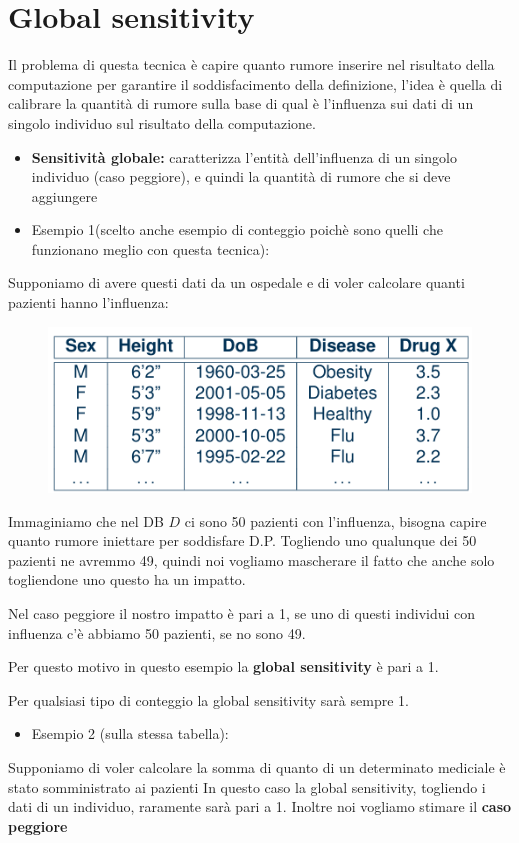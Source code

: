 \documentclass{report}
\begin{document}
\section{Global sensitivity}
Il problema di questa tecnica è capire quanto rumore inserire nel risultato della computazione per garantire il soddisfacimento della definizione,
l'idea è quella di calibrare la quantità di rumore sulla base di qual è l'influenza sui dati di un singolo individuo sul risultato della computazione.

\begin{itemize}
    \item \textbf{Sensitività globale:} caratterizza l'entità dell'influenza di un singolo individuo (caso peggiore), e quindi la quantità di rumore che si deve aggiungere 
\end{itemize}

\begin{itemize}
    \item  Esempio 1(scelto anche esempio di conteggio poichè sono quelli che funzionano meglio con questa tecnica):
\end{itemize}

\noindent Supponiamo di avere questi dati da un ospedale e di voler calcolare quanti pazienti hanno l'influenza:
\begin{figure}[H]
        \centering
        \includegraphics[width=0.4\linewidth]{images/pazienti.png}
    \end{figure}
\noindent Immaginiamo che nel DB $D$ ci sono 50 pazienti con l'influenza, bisogna capire quanto rumore iniettare per soddisfare D.P.
Togliendo uno qualunque dei 50 pazienti ne avremmo 49, quindi noi vogliamo mascherare il fatto che anche solo togliendone uno questo ha un impatto.


\noindent Nel caso peggiore il nostro impatto è pari a 1, se uno di questi individui con influenza c'è abbiamo 50 pazienti, se no sono 49.

\noindent Per questo motivo in questo esempio la \textbf{global sensitivity} è pari a 1.

\noindent Per qualsiasi tipo di conteggio la global sensitivity sarà sempre 1. 

\begin{itemize}
    \item Esempio 2 (sulla stessa tabella):
\end{itemize}
\noindent Supponiamo di voler calcolare la somma di quanto di un determinato mediciale è stato somministrato ai pazienti
In questo caso la global sensitivity, togliendo i dati di un individuo, raramente sarà pari a 1. Inoltre noi vogliamo stimare il \textbf{caso peggiore}
\end{document}
